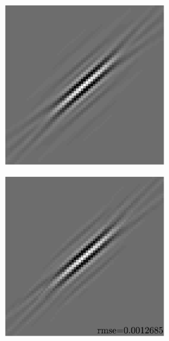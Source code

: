\begin{figure}[!ht]\centering
\begin{subfigure}[b]{0.4\textwidth}\centering
	\begin{subfigure}[b]{1\textwidth}\centering
	\includegraphics[width=\textwidth]{figures/variable_support/xp_128x128_sc2_angl1_K3_S3_node4_variable_target.pdf}
	\end{subfigure}
	\begin{subfigure}[b]{1\textwidth}\centering
	\includegraphics[width=\textwidth]{figures/variable_support/xp_128x128_sc2_angl1_K3_S3_node4_variable_approx.pdf}

\end{subfigure}
\end{subfigure}
\end{figure}
